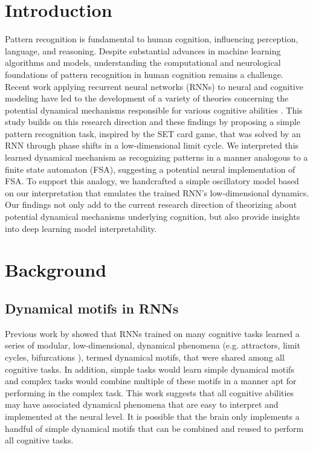 \documentclass[conference]{IEEEtran}
\begin{document}
\section{Introduction}
Pattern recognition is fundamental to human cognition, influencing perception, language, and reasoning\cite{inhelder1964early}. Despite substantial advances in machine learning algorithms and models\cite{bishop2006pattern,lecun2015deep}, understanding the computational and neurological foundations of pattern recognition in human cognition remains a challenge. Recent work applying recurrent neural networks (RNNs) to neural and cognitive modeling have led to the development of a variety of theories concerning the potential dynamical mechanisms responsible for various cognitive abilities \cite{sussillo2013opening,mante2013context,driscoll2022flexible,kay2022neural,pals2023trained}. This study builds on this research direction and these findings by proposing a simple pattern recognition task, inspired by the SET card game, that was solved by an RNN through phase shifts in a low-dimensional limit cycle. We interpreted this learned dynamical mechanism as recognizing patterns in a manner analogous to a finite state automaton (FSA), suggesting a potential neural implementation of FSA. To support this analogy, we handcrafted a simple oscillatory model based on our interpretation that emulates the trained RNN's low-dimensional dynamics. Our findings not only add to the current research direction of theorizing about potential dynamical mechanisms underlying cognition, but also provide insights into deep learning model interpretability.

\section{Background}

\subsection{Dynamical motifs in RNNs}

Previous work by \cite{driscoll2022flexible} showed that RNNs trained on many cognitive tasks learned a series of modular, low-dimensional, dynamical phenomena (e.g. attractors, limit cycles, bifurcations \cite{strogatz2018nonlinear}), termed dynamical motifs, that were shared among all cognitive tasks. In addition, simple tasks would learn simple dynamical motifs and complex tasks would combine multiple of these motifs in a manner apt for performing in the complex task. This work suggests that all cognitive abilities may have associated dynamical phenomena that are easy to interpret and implemented at the neural level. It is possible that the brain only implements a handful of simple dynamical motifs that can be combined and reused to perform all cognitive tasks.
\end{document}
